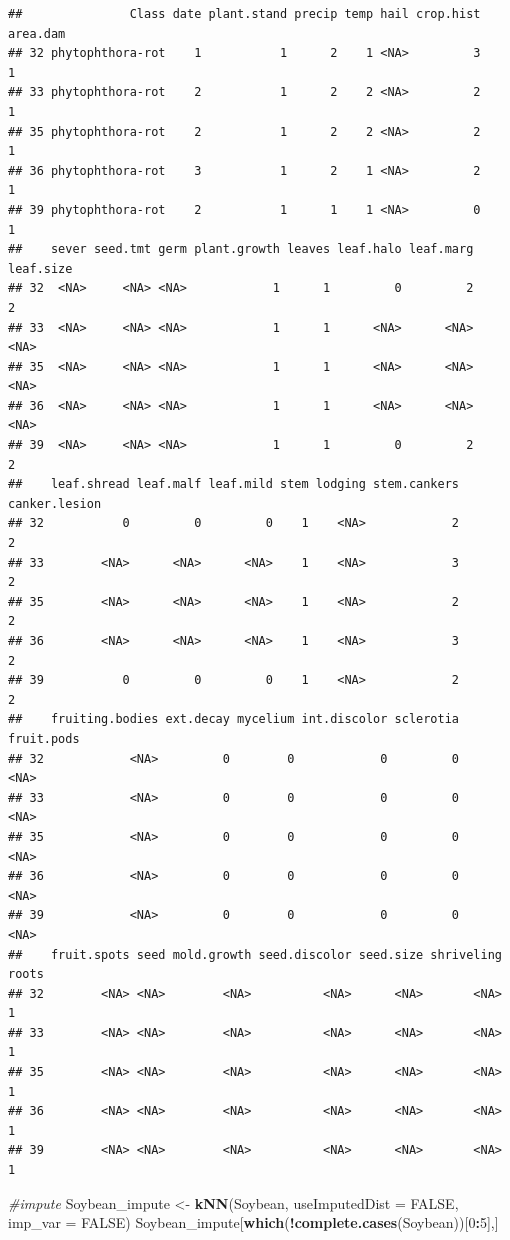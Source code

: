 \documentclass[]{book}
\newenvironment{Shaded}{\begin{snugshade}}{\end{snugshade}}
\newcommand{\CommentTok}[1]{\textcolor[rgb]{0.56,0.35,0.01}{\textit{#1}}}
\newcommand{\DataTypeTok}[1]{\textcolor[rgb]{0.13,0.29,0.53}{#1}}
\newcommand{\DecValTok}[1]{\textcolor[rgb]{0.00,0.00,0.81}{#1}}
\newcommand{\KeywordTok}[1]{\textcolor[rgb]{0.13,0.29,0.53}{\textbf{#1}}}
\newcommand{\NormalTok}[1]{#1}
\newcommand{\OperatorTok}[1]{\textcolor[rgb]{0.81,0.36,0.00}{\textbf{#1}}}
\newcommand{\OtherTok}[1]{\textcolor[rgb]{0.56,0.35,0.01}{#1}}
\newcommand{\StringTok}[1]{\textcolor[rgb]{0.31,0.60,0.02}{#1}}
\begin{document}
\begin{verbatim}
##               Class date plant.stand precip temp hail crop.hist area.dam
## 32 phytophthora-rot    1           1      2    1 <NA>         3        1
## 33 phytophthora-rot    2           1      2    2 <NA>         2        1
## 35 phytophthora-rot    2           1      2    2 <NA>         2        1
## 36 phytophthora-rot    3           1      2    1 <NA>         2        1
## 39 phytophthora-rot    2           1      1    1 <NA>         0        1
##    sever seed.tmt germ plant.growth leaves leaf.halo leaf.marg leaf.size
## 32  <NA>     <NA> <NA>            1      1         0         2         2
## 33  <NA>     <NA> <NA>            1      1      <NA>      <NA>      <NA>
## 35  <NA>     <NA> <NA>            1      1      <NA>      <NA>      <NA>
## 36  <NA>     <NA> <NA>            1      1      <NA>      <NA>      <NA>
## 39  <NA>     <NA> <NA>            1      1         0         2         2
##    leaf.shread leaf.malf leaf.mild stem lodging stem.cankers canker.lesion
## 32           0         0         0    1    <NA>            2             2
## 33        <NA>      <NA>      <NA>    1    <NA>            3             2
## 35        <NA>      <NA>      <NA>    1    <NA>            2             2
## 36        <NA>      <NA>      <NA>    1    <NA>            3             2
## 39           0         0         0    1    <NA>            2             2
##    fruiting.bodies ext.decay mycelium int.discolor sclerotia fruit.pods
## 32            <NA>         0        0            0         0       <NA>
## 33            <NA>         0        0            0         0       <NA>
## 35            <NA>         0        0            0         0       <NA>
## 36            <NA>         0        0            0         0       <NA>
## 39            <NA>         0        0            0         0       <NA>
##    fruit.spots seed mold.growth seed.discolor seed.size shriveling roots
## 32        <NA> <NA>        <NA>          <NA>      <NA>       <NA>     1
## 33        <NA> <NA>        <NA>          <NA>      <NA>       <NA>     1
## 35        <NA> <NA>        <NA>          <NA>      <NA>       <NA>     1
## 36        <NA> <NA>        <NA>          <NA>      <NA>       <NA>     1
## 39        <NA> <NA>        <NA>          <NA>      <NA>       <NA>     1
\end{verbatim}

\begin{Shaded}
\begin{Highlighting}[]
\CommentTok{#impute}
\NormalTok{Soybean_impute <-}\StringTok{ }\KeywordTok{kNN}\NormalTok{(Soybean,  }\DataTypeTok{useImputedDist =} \OtherTok{FALSE}\NormalTok{, }\DataTypeTok{imp_var =} \OtherTok{FALSE}\NormalTok{)}
\NormalTok{Soybean_impute[}\KeywordTok{which}\NormalTok{(}\OperatorTok{!}\KeywordTok{complete.cases}\NormalTok{(Soybean))[}\DecValTok{0}\OperatorTok{:}\DecValTok{5}\NormalTok{],]}
\end{Highlighting}
\end{Shaded}
\end{document}
